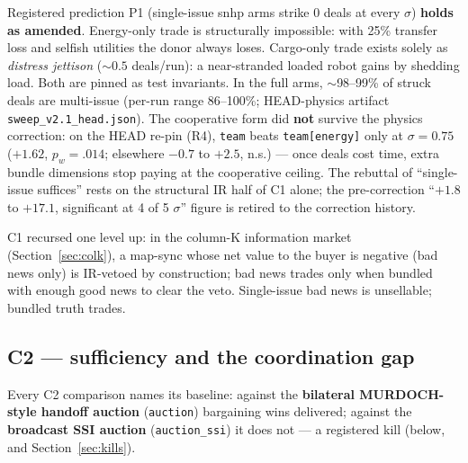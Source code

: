 \documentclass[sigconf,nonacm]{acmart}
\begin{document}
Registered prediction P1 (single-issue snhp arms strike 0 deals at every
$\sigma$) \textbf{holds as amended}. Energy-only trade is structurally
impossible: with 25\% transfer loss and selfish utilities the donor always
loses. Cargo-only trade exists solely as \emph{distress jettison}
(${\sim}0.5$ deals/run): a near-stranded loaded robot gains by shedding
load. Both are pinned as test invariants. In the full arms,
${\sim}$98--99\% of struck deals are multi-issue (per-run range 86--100\%;
HEAD-physics artifact \texttt{sweep\_v2.1\_head.json}). The cooperative
form did \textbf{not} survive the physics correction: on the HEAD re-pin
(R4), \texttt{team} beats \texttt{team[energy]} only at $\sigma{=}0.75$
($+1.62$, $p_w{=}.014$; elsewhere $-0.7$ to $+2.5$, n.s.) --- once deals
cost time, extra bundle dimensions stop paying at the cooperative ceiling.
The rebuttal of ``single-issue suffices'' rests on the structural IR half
of C1 alone; the pre-correction ``$+1.8$ to $+17.1$, significant at 4 of 5
$\sigma$'' figure is retired to the correction history.

C1 recursed one level up: in the column-K information market
(Section~\ref{sec:colk}), a map-sync whose net value to the buyer is
negative (bad news only) is IR-vetoed by construction; bad news trades only
when bundled with enough good news to clear the veto. Single-issue bad news
is unsellable; bundled truth trades.

\subsection{C2 --- sufficiency and the coordination gap}\label{sec:c2}

Every C2 comparison names its baseline: against the \textbf{bilateral
MURDOCH-style handoff auction} (\texttt{auction}) bargaining wins
delivered; against the \textbf{broadcast SSI auction}
(\texttt{auction\_ssi}) it does not --- a registered kill (below, and
Section~\ref{sec:kills}).
\end{document}
